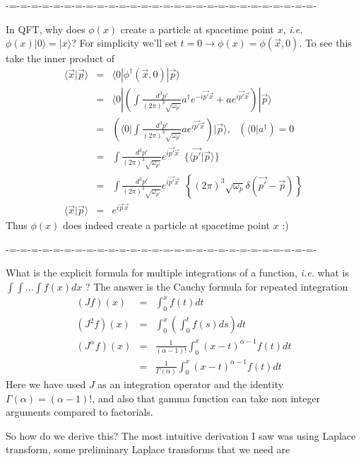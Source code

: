 \documentclass[aps,preprint,preprintnumbers,nofootinbib,showpacs,prd]{revtex4-1}
\newcommand{\ie}{{\it i.e.} }
\newcommand{\nbea}{\begin{eqnarray*}}
\newcommand{\neea}{\end{eqnarray*}}
\begin{document}
-=-=-=-=-=-=-=-=-=-=-=-=-=-=-=-=-=-=-=-=-=-=-=-=-=-=-=-=-

In QFT, why does $\phi(x)$ create a particle at spacetime point $x$, \ie $\phi(x)| 0 \rangle = |x \rangle$? For simplicity we'll set $t = 0 \rightarrow \phi(x) = \phi(\vec x, 0)$. To see this take the inner product of
\nbea
\langle \vec x | \vec p \rangle & = & \langle 0 |\phi^\dagger(\vec x, 0) | \vec p \rangle \\
& = & \langle 0 | \left ( \int \frac{d^3 p'}{(2 \pi)^3 \sqrt{\omega_{p'}}} a^\dagger e^{-i\vec {p'} \vec x} +  a e^{i\vec {p'} \vec x} \right ) | \vec p \rangle \\
& = & \left ( \langle 0 | \int \frac{d^3 p'}{(2 \pi)^3 \sqrt{\omega_{p'}}} a e^{i\vec {p'} \vec x} \right ) | \vec p \rangle, ~~~ ( \langle 0 | a^\dagger ) = 0 \\
& = & \int \frac{d^3 p'}{(2 \pi)^3 \sqrt{\omega_{p'}}} e^{i\vec {p'} \vec x} ~~ \{ \langle \vec {p'} | \vec p \rangle \} \\
& = & \int \frac{d^3 p'}{(2 \pi)^3 \sqrt{\omega_{p'}}} e^{i\vec {p'} \vec x} ~~ \left \{ (2 \pi)^3 \sqrt{\omega_{p}} \delta (\vec {p'} - \vec p) \right \} \\
\langle \vec x | \vec p \rangle & = & e^{i\vec {p} \vec x}
\neea
Thus $\phi(x)$ does indeed create a particle at spacetime point $x$ :)

-=-=-=-=-=-=-=-=-=-=-=-=-=-=-=-=-=-=-=-=-=-=-=-=-=-=-=-=-

What is the explicit formula for multiple integrations of a function, \ie what is $\int\int \dots \int f(x) dx$ ? The answer is the Cauchy formula for repeated integration
\nbea
(J f)(x) & = & \int_0^x f(t) dt \\
(J^2 f)(x) & = & \int_0^x \left ( \int_0^t f(s) ds \right ) dt \\
(J^\alpha f)(x) & = & \frac{1}{(\alpha - 1)!}\int_0^x (x - t)^{\alpha-1} f(t) dt \\
& = & \frac{1}{\Gamma(\alpha)}\int_0^x (x - t)^{\alpha-1} f(t) dt
\neea
Here we have used $J$ as an integration operator and the identity $\Gamma(\alpha) = (\alpha-1)!$, and also that gamma function can take non integer arguments compared to factorials.

So how do we derive this? The most intuitive derivation I saw was using Laplace transform, some preliminary Laplace transforms that we need are
\end{document}
